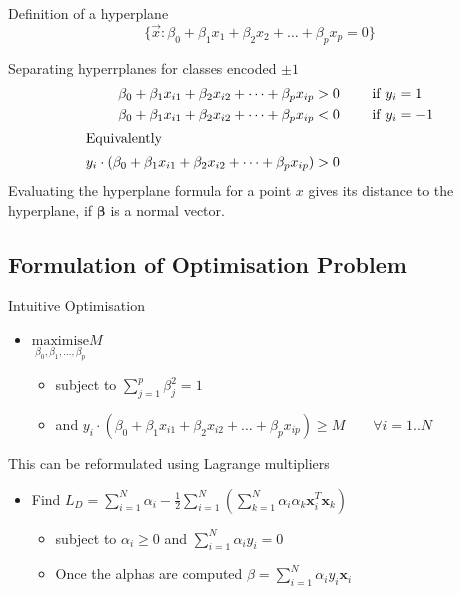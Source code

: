 \documentclass[11pt]{article}
\theoremstyle{definition}
\begin{document}
\begin{definition}
	Definition of a hyperplane
	\begin{equation*}
		\{ \vec{x}: \beta_0 + \beta_1 x_1 + \beta_2 x_2 + \dots + \beta_p x_p = 0 \}
	\end{equation*}
\end{definition}
Separating hyperrplanes for classes encoded $\pm 1$
\begin{align*}
	\beta_0 + \beta_1 x_{i1} + \beta_2 x_{i2} + \dots + \beta_p x_{ip} &> 0 \qquad \text{ if } y_i = 1\\
	\beta_0 + \beta_1 x_{i1} + \beta_2 x_{i2} + \dots + \beta_p x_{ip} &< 0 \qquad \text{ if } y_i = -1\\
	\intertext{Equivalently}
	y_i\cdot (\beta_0 + \beta_1 x_{i1} + \beta_2 x_{i2} + \dots + \beta_p x_{ip}) &> 0
\end{align*}
Evaluating the hyperplane formula for a point $x$ gives its distance to the hyperplane, if $\bm{\beta}$ is a normal vector.

\subsection{Formulation of Optimisation Problem}
Intuitive Optimisation
\begin{itemize}[noitemsep]
	\item $\underset{\beta_0,\beta_1,\dots,\beta_p}{\text{maximise}} M$
	\begin{itemize}
		\item subject to $\sum_{j=1}^{p}\beta_j^2 = 1$
		\item and $y_i\cdot (\beta_0 + \beta_1 x_{i1} + \beta_2 x_{i2} + \dots + \beta_p x_{ip}) \geq M\qquad\forall i = 1..N$
	\end{itemize}
\end{itemize}
This can be reformulated using {\color{DodgerBlue2} Lagrange multipliers}
\begin{itemize}[noitemsep]
	\item Find $L_D = \sum_{i=1}^{N} \alpha_i - \frac{1}{2} \sum_{i=1}^{N}\left( \sum_{k=1}^{N} \alpha_i \alpha_k \bm{x}_i^T \bm{x}_k \right) $
		\begin{itemize}
		\item subject to $ \alpha_i \geq 0 $ and $\sum_{i=1}^{N} \alpha_i y_i = 0$
		\item Once the alphas are computed $\beta = \sum_{i=1}^{N} \alpha_i y_i \bm{x}_i$
	\end{itemize}
\end{itemize}
\end{document}
